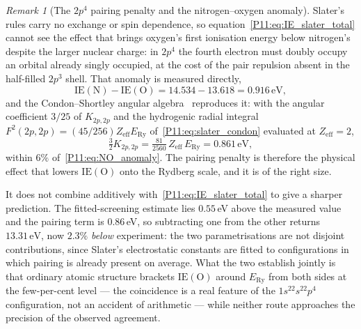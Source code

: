 \documentclass[11pt,a4paper]{article}
\theoremstyle{definition}
\theoremstyle{remark}
\newtheorem{remark}[theorem]{Remark}
\newcommand{\ERy}{E_{\mathrm{Ry}}}
\newcommand{\IE}{\mathrm{IE}}
\begin{document}
\begin{remark}[The $2p^4$ pairing penalty and the nitrogen--oxygen anomaly]
\label{P11:rem:pairing_penalty}
Slater's rules carry no exchange or spin dependence, so
equation~\eqref{P11:eq:IE_slater_total} cannot see the effect that
brings oxygen's first ionisation energy below nitrogen's despite the
larger nuclear charge: in $2p^4$ the fourth electron must doubly
occupy an orbital already singly occupied, at the cost of the pair
repulsion absent in the half-filled $2p^3$ shell.  That anomaly is
measured directly,
\begin{equation}
  \IE(\mathrm{N}) - \IE(\mathrm{O})
  = 14.534 - 13.618 = 0.916\,\mathrm{eV},
  \label{P11:eq:NO_anomaly}
\end{equation}
and the Condon--Shortley angular algebra~\cite{Condon1935} reproduces
it: with the angular coefficient $3/25$ of $K_{2p,2p}$ and the hydrogenic
radial integral $F^2(2p,2p) = (45/256)Z_\mathrm{eff}\ERy$
of~\eqref{P11:eq:slater_condon} evaluated at $Z_\mathrm{eff}=2$,
\begin{equation}
  \tfrac{3}{2}K_{2p,2p} = \tfrac{81}{2560}\,Z_\mathrm{eff}\,\ERy
  = 0.861\,\mathrm{eV},
  \label{P11:eq:pairing_K}
\end{equation}
within $6\%$ of~\eqref{P11:eq:NO_anomaly}.  The pairing penalty is
therefore the physical effect that lowers $\IE(\mathrm{O})$ onto the
Rydberg scale, and it is of the right size.

It does not combine additively with~\eqref{P11:eq:IE_slater_total} to
give a sharper prediction.  The fitted-screening estimate lies $0.55\,$eV above the measured
value and the pairing term is $0.86\,$eV, so subtracting one from the
other returns $13.31\,\mathrm{eV}$, now $2.3\%$ \emph{below}
experiment: the two parametrisations are not
disjoint contributions, since Slater's electrostatic constants are
fitted to configurations in which pairing is already present on
average.  What the two establish jointly is that ordinary atomic
structure brackets $\IE(\mathrm{O})$ around $\ERy$ from both sides at
the few-per-cent level --- the coincidence is a real feature of the
$1s^22s^22p^4$ configuration, not an accident of arithmetic --- while
neither route approaches the precision of the observed agreement.
\end{remark}
\end{document}
